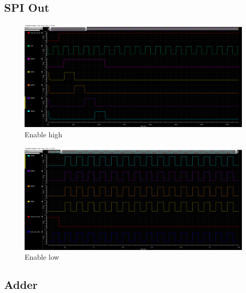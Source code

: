 \subsection{SPI Out}

\begin{figure}[H]
  \centering
  \captionsetup{justification=centering}
  \includegraphics[angle=90, scale=0.45]{../figures/spi_out_control}
  \caption{Enable high} \label{fig:G_inv_out}
\end{figure}

\begin{figure}[H]
  \centering
  \captionsetup{justification=centering}
  \includegraphics[angle=90, scale=0.46]{../figures/spi_out_control2}
  \caption{Enable low} \label{fig:G_inv_out}
\end{figure}

\subsection{Adder}

